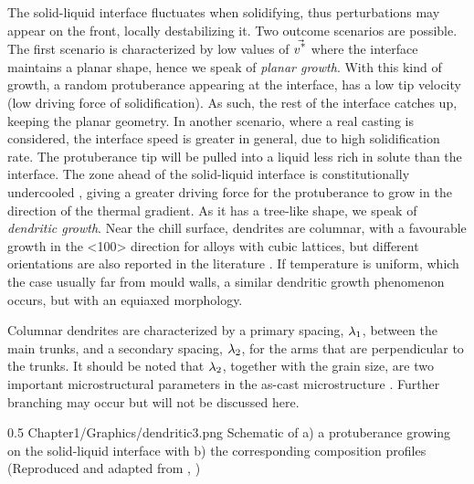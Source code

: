 The solid-liquid interface fluctuates when solidifying, thus perturbations may appear on the front, locally destabilizing it. 
Two outcome scenarios are possible.
The first scenario is characterized by low values of $\vec{v^\text{*}}$ where the interface maintains a planar shape, hence we speak of \emph{planar growth}. 
With this kind of growth, a random protuberance appearing at the interface, has a low tip velocity (low driving force of solidification). As such,
the rest of the interface catches up, keeping the planar geometry.
In another scenario, where a real casting is considered, the interface speed is greater in general, due to high solidification rate.
The protuberance tip will be pulled into a liquid less rich in solute than the interface. The zone ahead of the solid-liquid interface is constitutionally undercooled \citep{tiller_redistribution_1953}, giving a greater driving force for the protuberance to grow in the direction
of the thermal gradient. As it has a tree-like shape, we speak of \emph{dendritic growth}. Near the chill surface, dendrites are columnar, with a 
favourable growth in the <100> direction for alloys with cubic lattices, but different orientations are also reported in the literature \citep[see][289]{dantzig_solidification_2009}.
If temperature is uniform, which the case usually far from mould walls, a similar dendritic growth phenomenon occurs, but with an equiaxed morphology.

Columnar dendrites are characterized by a primary spacing, ${\lambda}_{1}$, between the main trunks, and a secondary spacing, ${\lambda}_{2}$, for the arms that are perpendicular
to the trunks. It should be noted that ${\lambda}_{2}$, together with the grain size, are two important microstructural parameters in the as-cast microstructure \citep{easton_grain_2011}.
Further branching may occur but will not be discussed here.
\begin{figureth}
{0.5}
{Chapter1/Graphics/dendritic3.png}
{Schematic of a) a protuberance growing on the solid-liquid interface with b) the corresponding composition profiles 
(Reproduced and adapted from \citet{doitpoms_dissemination_2000}, \doitpoms)}
\label{fig:dendritic_growth}
\end{figureth}
